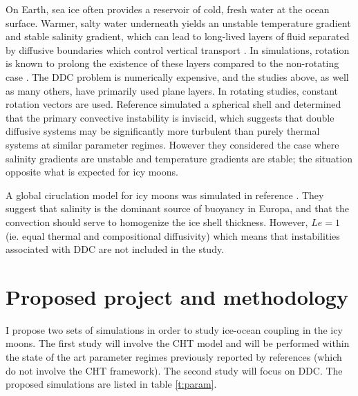 \documentclass{article}
\begin{document}
On Earth, sea ice often provides a reservoir of cold, fresh water at the ocean surface. 
Warmer, salty water underneath yields an unstable temperature gradient and stable salinity gradient, which can lead to long-lived layers of fluid separated by diffusive boundaries which control vertical transport \citep{mT08,jT73,jT02}. 
In simulations, rotation is known to prolong the existence of these layers compared to the non-rotating case \citep{jF24}.
The DDC problem is numerically expensive, and the studies above, as well as many others, have primarily used plane layers. In rotating studies, constant rotation vectors are used\citep{gM12,rM17}.  
Reference \citep{rM19} simulated a spherical shell and determined that the primary convective instability is inviscid, which suggests that double diffusive systems may be significantly more turbulent than purely thermal systems at similar parameter regimes. However they considered the case where salinity gradients are unstable and temperature gradients are stable; the situation opposite what is expected for icy moons.

A global ciruclation model for icy moons was simulated in reference \citep{yA21}. They suggest that salinity is the dominant source of buoyancy in Europa, and that the convection should serve to homogenize the ice shell thickness. However, $Le=1$ (ie. equal thermal and compositional diffusivity) which means that instabilities associated with DDC are not included in the study.

\section{Proposed project and methodology}
I propose two sets of simulations in order to study ice-ocean coupling in the icy moons. The first study will involve the CHT model and will be performed within the state of the art parameter regimes previously reported by references\citep{dL23,kS19} (which do not involve the CHT framework).
The second study will focus on DDC. The proposed simulations are listed in table \ref{t:param}.
\end{document}
